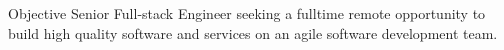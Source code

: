 \begin{section}{Objective}
  Senior Full-stack Engineer seeking a fulltime remote opportunity to build high quality software and services on an agile software development team.
\end{section}
